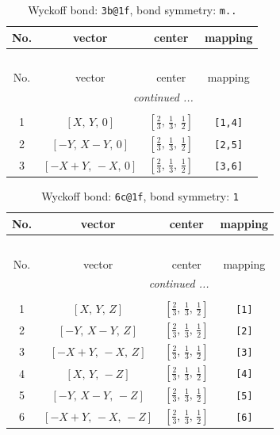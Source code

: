 \documentclass[fleqn,8pt]{jsarticle}
\begin{document}
\renewcommand{\arraystretch}{1.2}
\begin{longtable}{cccc}
\caption{Wyckoff bond: {\tt 3b@1f}, bond symmetry: {\tt m..}}
 \\
 \hline \hline
No. & vector & center & mapping \\ \hline \endfirsthead

\multicolumn{3}{l}{\tablename\ \thetable{}} \\
 \hline \hline
No. & vector & center & mapping \\ \hline \endhead

 \hline \hline
\multicolumn{3}{r}{\footnotesize\it continued ...} \\ \endfoot

 \hline \hline
\multicolumn{3}{r}{} \\ \endlastfoot

1 & $\left[ X,\, Y,\, 0 \right]$ & $\left[ \frac{2}{3},\, \frac{1}{3},\, \frac{1}{2} \right]$ & {\tt [1,4]} \\ \hline
2 & $\left[ - Y,\, X - Y,\, 0 \right]$ & $\left[ \frac{2}{3},\, \frac{1}{3},\, \frac{1}{2} \right]$ & {\tt [2,5]} \\ \hline
3 & $\left[ - X + Y,\, - X,\, 0 \right]$ & $\left[ \frac{2}{3},\, \frac{1}{3},\, \frac{1}{2} \right]$ & {\tt [3,6]} \\
\end{longtable}
\renewcommand{\arraystretch}{1.2}
\begin{longtable}{cccc}
\caption{Wyckoff bond: {\tt 6c@1f}, bond symmetry: {\tt 1}}
 \\
 \hline \hline
No. & vector & center & mapping \\ \hline \endfirsthead

\multicolumn{3}{l}{\tablename\ \thetable{}} \\
 \hline \hline
No. & vector & center & mapping \\ \hline \endhead

 \hline \hline
\multicolumn{3}{r}{\footnotesize\it continued ...} \\ \endfoot

 \hline \hline
\multicolumn{3}{r}{} \\ \endlastfoot

1 & $\left[ X,\, Y,\, Z \right]$ & $\left[ \frac{2}{3},\, \frac{1}{3},\, \frac{1}{2} \right]$ & {\tt [1]} \\ \hline
2 & $\left[ - Y,\, X - Y,\, Z \right]$ & $\left[ \frac{2}{3},\, \frac{1}{3},\, \frac{1}{2} \right]$ & {\tt [2]} \\ \hline
3 & $\left[ - X + Y,\, - X,\, Z \right]$ & $\left[ \frac{2}{3},\, \frac{1}{3},\, \frac{1}{2} \right]$ & {\tt [3]} \\ \hline
4 & $\left[ X,\, Y,\, - Z \right]$ & $\left[ \frac{2}{3},\, \frac{1}{3},\, \frac{1}{2} \right]$ & {\tt [4]} \\ \hline
5 & $\left[ - Y,\, X - Y,\, - Z \right]$ & $\left[ \frac{2}{3},\, \frac{1}{3},\, \frac{1}{2} \right]$ & {\tt [5]} \\ \hline
6 & $\left[ - X + Y,\, - X,\, - Z \right]$ & $\left[ \frac{2}{3},\, \frac{1}{3},\, \frac{1}{2} \right]$ & {\tt [6]} \\
\end{longtable}
\end{document}
